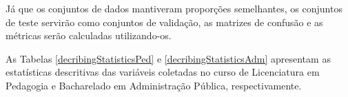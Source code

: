 \begin{figure}[!htb]
  \vspace{1.5em}
  \Ididthis
\end{figure}

Já que os conjuntos de dados mantiveram proporções semelhantes, os conjuntos de
teste servirão como conjuntos de validação, as matrizes de confusão e as
métricas serão calculadas utilizando-os.

As Tabelas \ref{decribingStatisticsPed} e \ref{decribingStatisticsAdm}
apresentam as estatísticas descritivas das variáveis coletadas no curso de
Licenciatura em Pedagogia e Bacharelado em Administração Pública,
respectivamente.

